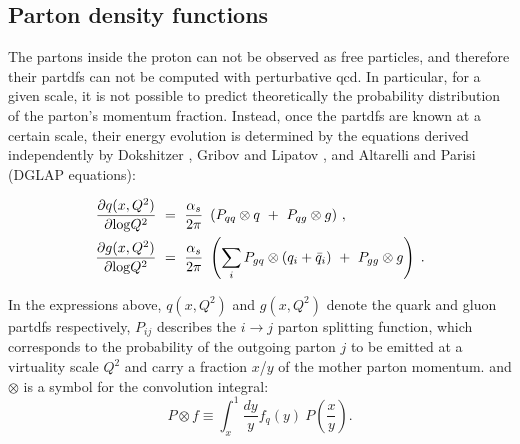 


\subsection{Parton density functions}
\label{sec:protpdf}

The partons inside the proton can not be observed as free particles, and therefore their \glspl{partdf} can not be computed with
perturbative \gls{qcd}. In particular, for a given scale, it is not possible to predict theoretically the probability distribution 
of the parton's momentum fraction. Instead, once the \glspl{partdf} are known at a certain scale, their energy evolution is 
determined by the equations derived independently by Dokshitzer \cite{Dokshitzer:1977sg} , Gribov and Lipatov \cite{Gribov:1972ri}, and Altarelli and Parisi \cite{ALTARELLI1977298} (DGLAP equations):

\begin{equation}
\begin{aligned}
\frac{\partial q(x,Q^2)}{\partial {\rm log}Q^2}~&=~\frac{\alpha_s}{2\pi}~\left( P_{qq} \otimes q~+~P_{qg} \otimes g \right) \, ,\\
\frac{\partial g(x,Q^2)}{\partial {\rm log}Q^2}~&=~\frac{\alpha_s}{2\pi}~\left( \sum_i P_{gq} \otimes (q_i+\bar{q}_i)~+~P_{gg} \otimes g \right) \; .
\label{eq:glap1}
\end{aligned}
\end{equation}

\noindent In the expressions above, $q(x,Q^2)$ and $g(x,Q^2)$ denote the quark and gluon \glspl{partdf} respectively, 
$P_{ij}$ describes the $i \to j$ parton splitting function, 
which corresponds to the probability of the outgoing parton $j$ 
to be emitted at a virtuality scale $Q^2$ and carry a fraction $x$/$y$ of the mother parton momentum.
and $\otimes$ is a symbol for the convolution integral:
\begin{equation}
P \otimes f \equiv \int^1_x\frac{dy}{y}f_q(y)~P\left(\frac{x}{y}\right).
\end{equation}

